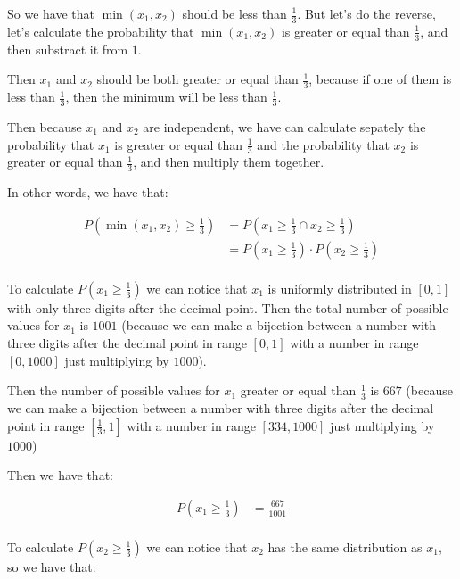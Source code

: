 So we have that $\min(x_1, x_2)$ should be less than $\frac{1}{3}$.
But let's do the reverse, let's calculate the probability that
$\min(x_1, x_2)$ is greater or equal than $\frac{1}{3}$, and then
substract it from $1$.

Then $x_1$ and $x_2$ should be both greater or equal than
$\frac{1}{3}$, because if one of them is less than $\frac{1}{3}$, then
the minimum will be less than $\frac{1}{3}$.

Then because $x_1$ and $x_2$ are independent, we have can calculate
sepately the probability that $x_1$ is greater or equal than
$\frac{1}{3}$ and the probability that $x_2$ is greater or equal than
$\frac{1}{3}$, and then multiply them together.

In other words, we have that:

\begin{equation*}
    \begin{split}
        P(\min(x_1, x_2) \geq \frac{1}{3}) & = P(x_1 \geq \frac{1}{3} \cap x_2 \geq \frac{1}{3})     \\
                                           & = P(x_1 \geq \frac{1}{3}) \cdot P(x_2 \geq \frac{1}{3}) \\
    \end{split}
\end{equation*}

To calculate $P(x_1 \geq \frac{1}{3})$ we can notice that $x_1$ is
uniformly distributed in $[0,1]$ with only three digits after the
decimal point. Then the total number of possible values for $x_1$ is
$1001$ (because we can make a bijection between a number with three
digits after the decimal point in range $[0,1]$ with a number in
range $[0,1000]$ just multiplying by $1000$).

Then the number of possible values for $x_1$ greater or equal than
$\frac{1}{3}$ is $667$ (because we can make a bijection between a number with three
digits after the decimal point in range $[\frac{1}{3},1]$ with a
number in range $[334,1000]$ just multiplying by $1000$)

Then we have that:

\begin{equation*}
    \begin{split}
        P(x_1 \geq \frac{1}{3}) & = \frac{667}{1001} \\
    \end{split}
\end{equation*}

To calculate $P(x_2 \geq \frac{1}{3})$ we can notice that $x_2$ has
the same distribution as $x_1$, so we have that:

